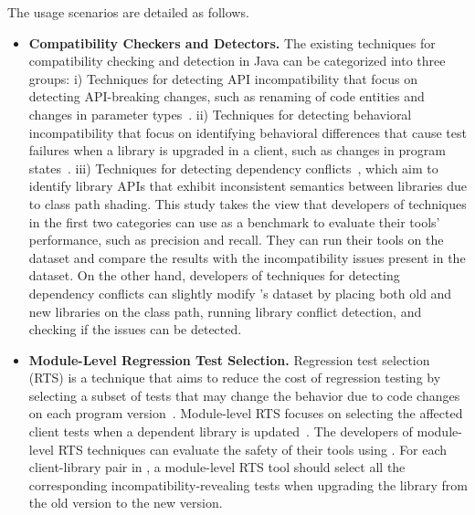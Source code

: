 The usage scenarios are detailed as follows.
\begin{itemize}[leftmargin=*,topsep=2pt]
    \item \textbf{Compatibility Checkers and Detectors.}
      The existing techniques for compatibility checking and detection
      in Java can be categorized into three groups: i) Techniques for
      detecting API incompatibility that focus on detecting
      API-breaking changes, such as renaming of code entities and
      changes in parameter types~\cite{li2018cid,he2018understanding,scalabrino2019data,wei2019pivot,huang2018understanding}. ii)
      Techniques for detecting behavioral incompatibility that focus
      on identifying behavioral differences that cause test failures
      when a library is upgraded in a client, such as changes in
      program states~\cite{zhuclient,mora2018client}. iii) Techniques for
      detecting dependency conflicts~\cite{wang2021will,wang2018dependency,wang2019could},
      which aim to identify library APIs that exhibit inconsistent
      semantics between libraries due to class path shading. This study takes the view that developers of techniques in the first two
      categories can use \toolcompsuite as a benchmark to evaluate their tools'
      performance, such as precision and recall. They can run their
      tools on the \toolcompsuite dataset and compare the results with the
      incompatibility issues present in the dataset. On the other
      hand, developers of techniques for detecting dependency
      conflicts can slightly modify \toolcompsuite's dataset by placing both
      old and new libraries on the class path, running library
      conflict detection, and checking if the issues can be detected.

    \item \textbf{Module-Level Regression Test Selection.}  Regression
      test selection (RTS) is a technique that aims to reduce the cost
      of regression testing by selecting a subset of tests that may
      change the behavior due to code changes on each program
      version~\cite{gligoric2015practical,legunsen2016extensive,zhang2018hybrid,zhu2019framework}. Module-level
      RTS focuses on selecting the affected client tests when a
      dependent library is updated~\cite{gyori2018evaluating}. The developers of
      module-level RTS techniques can evaluate the safety of their
      tools using \toolcompsuite. For each client-library pair in \toolcompsuite, a
      module-level RTS tool should select all the corresponding
      incompatibility-revealing tests when upgrading the library from
      the old version to the new version.


\end{itemize}

